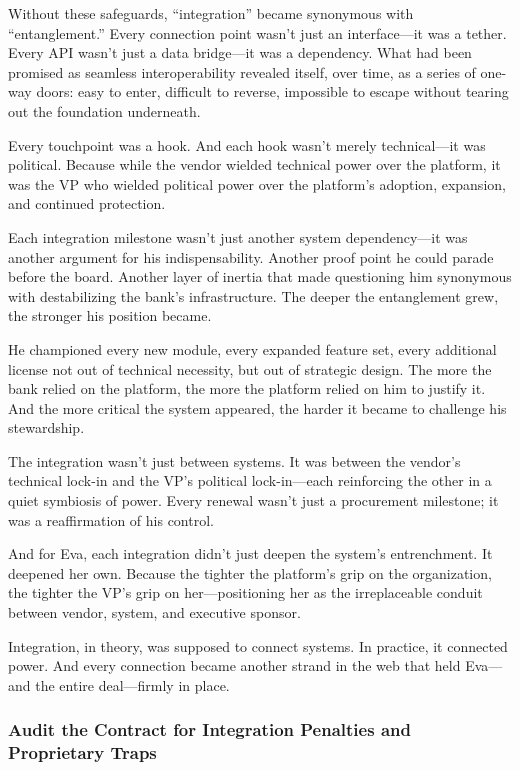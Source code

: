 Without these safeguards, “integration” became synonymous with “entanglement.” Every connection point wasn’t just an interface—it was a tether. Every API wasn’t just a data bridge—it was a dependency. What had been promised as seamless interoperability revealed itself, over time, as a series of one-way doors: easy to enter, difficult to reverse, impossible to escape without tearing out the foundation underneath.

Every touchpoint was a hook. And each hook wasn’t merely technical—it was political. Because while the vendor wielded technical power over the platform, it was the VP who wielded political power over the platform’s adoption, expansion, and continued protection.

Each integration milestone wasn’t just another system dependency—it was another argument for his indispensability. Another proof point he could parade before the board. Another layer of inertia that made questioning him synonymous with destabilizing the bank’s infrastructure. The deeper the entanglement grew, the stronger his position became.

He championed every new module, every expanded feature set, every additional license not out of technical necessity, but out of strategic design. The more the bank relied on the platform, the more the platform relied on him to justify it. And the more critical the system appeared, the harder it became to challenge his stewardship.

The integration wasn’t just between systems. It was between the vendor’s technical lock-in and the VP’s political lock-in—each reinforcing the other in a quiet symbiosis of power. Every renewal wasn’t just a procurement milestone; it was a reaffirmation of his control.

And for Eva, each integration didn’t just deepen the system’s entrenchment. It deepened her own. Because the tighter the platform’s grip on the organization, the tighter the VP’s grip on her—positioning her as the irreplaceable conduit between vendor, system, and executive sponsor.

Integration, in theory, was supposed to connect systems. In practice, it connected power. And every connection became another strand in the web that held Eva—and the entire deal—firmly in place.

\medskip

\subsubsection{Audit the Contract for Integration Penalties and Proprietary Traps}

